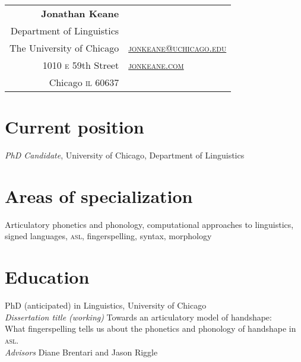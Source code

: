 \documentclass[10pt, letterpaper]{article}
\newcommand{\years}[1]{\marginpar{\scriptsize #1}}
\begin{document}
\thispagestyle{empty} %
\reversemarginpar
\raggedright

\begin{table}[!t]
  \begin{tabular*}{6.5in}{r|l}
    \hspace{3in}\textbf{\LARGE\sffamily Jonathan Keane}  &\\
Department of Linguistics & \\
  The University of Chicago & \href{mailto:jonkeane@uchicago.edu}{\textsc{jonkeane@uchicago.edu}}\\
1010 \textsc{e} 59th Street & \href{http://jonkeane.com}{\textsc{jonkeane.com}}\\
    Chicago \textsc{il} 60637 & \\
  \end{tabular*}
\end{table}
\setlength\parindent{0in}
\setlength\parskip{0ex}
\section*{Current position}
\emph{PhD Candidate}, University of Chicago, Department of Linguistics\\

\section*{Areas of specialization}
Articulatory phonetics and phonology, computational approaches to linguistics, signed languages, \textsc{asl}, fingerspelling, syntax, morphology


\section*{Education}
\-\years{2014}PhD (anticipated) in Linguistics, University of Chicago \\
\hspace{2em} \textit{Dissertation title (working)} Towards an articulatory model of handshape:\\
\hspace{4em}What fingerspelling tells us about the phonetics and phonology of handshape in \textsc{asl}.\\
\hspace{2em} \textit{Advisors} Diane Brentari and Jason Riggle
\end{document}
